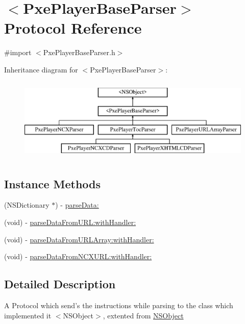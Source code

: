 \hypertarget{protocol_pxe_player_base_parser-p}{\section{$<$Pxe\-Player\-Base\-Parser$>$ Protocol Reference}
\label{protocol_pxe_player_base_parser-p}
}


{\ttfamily \#import $<$Pxe\-Player\-Base\-Parser.\-h$>$}

Inheritance diagram for $<$Pxe\-Player\-Base\-Parser$>$\-:\begin{figure}[H]
\begin{center}
\leavevmode
\includegraphics[height=4.000000cm]{protocol_pxe_player_base_parser-p}
\end{center}
\end{figure}
\subsection*{Instance Methods}
\begin{DoxyCompactItemize}
\item 
(N\-S\-Dictionary $\ast$) -\/ \hyperlink{protocol_pxe_player_base_parser-p_a2fa950852f2e1825b5dc923e9d66829d}{parse\-Data\-:}
\item 
(void) -\/ \hyperlink{protocol_pxe_player_base_parser-p_ab7d1135887db45a14aebe304bfbcddeb}{parse\-Data\-From\-U\-R\-L\-:with\-Handler\-:}
\item 
(void) -\/ \hyperlink{protocol_pxe_player_base_parser-p_acea3b0e43bf7c45bcd6978cf641c5097}{parse\-Data\-From\-U\-R\-L\-Array\-:with\-Handler\-:}
\item 
(void) -\/ \hyperlink{protocol_pxe_player_base_parser-p_af53b80aa420a6a41a4cb1beeef57abe5}{parse\-Data\-From\-N\-C\-X\-U\-R\-L\-:with\-Handler\-:}
\end{DoxyCompactItemize}


\subsection{Detailed Description}
A Protocol which send's the instructions while parsing to the class which implemented it  $<$\-N\-S\-Object$>$, extented from \hyperlink{class_n_s_object-p}{N\-S\-Object} 

